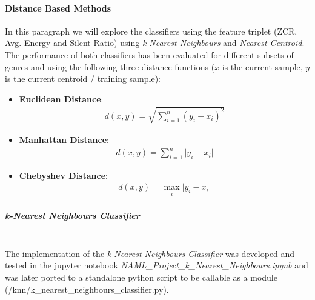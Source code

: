 \documentclass[12pt]{article}
\begin{document}
	\paragraph{Distance Based Methods}
	In this paragraph we will explore the classifiers using the feature triplet (ZCR, Avg. Energy and Silent Ratio) using \textit{k-Nearest Neighbours} and \textit{Nearest Centroid}. The performance of both classifiers has been evaluated for different subsets of genres and using the following three distance functions ($\mathit{x}$ is the current sample, $\mathit{y}$ is the current centroid / training sample):
	\begin{itemize}
		\item \textbf{Euclidean Distance}:\\
		\begin{align}
			d(x,y)=\sqrt{\sum_{i=1}^n{(y_i-x_i)^2}}
		\end{align}
		\item \textbf{Manhattan Distance}:\\
		\begin{align}
			d(x,y)=\sum_{i=1}^n{\big|y_i-x_i\big|}
		\end{align}
		\item \textbf{Chebyshev Distance}:\\
		\begin{align}
			d(x,y)=\max_i{\big|y_i-x_i\big|}
		\end{align}
	\end{itemize}
	\mbox{}\newpage
	\subparagraph{k-Nearest Neighbours Classifier}\mbox{}\\\newline
	The implementation of the \textit{k-Nearest Neighbours Classifier} was developed and tested in the jupyter notebook \textit{NAML\_Project\_k\_Nearest\_Neighbours.ipynb} and was later ported to a standalone python script to be callable as a module (/knn/k\_nearest\_neighbours\_classifier.py). 
\end{document}
